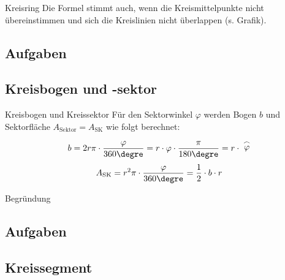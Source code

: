 \begin{bemerkung}{Kreisring}{}
  Die Formel stimmt auch, wenn die Kreismittelpunkte nicht
  übereinstimmen und sich die Kreislinien nicht überlappen (s. Grafik).
  \end{bemerkung}

\subsection*{Aufgaben}


\newpage


\subsection{Kreisbogen und -sektor}
\begin{gesetz}{Kreisbogen und
    Kreissektor}{}
  Für den Sektorwinkel $\varphi$ werden Bogen $b$ und Sektorfläche
  $A_{\text{Sektor}}=A_{\text{SK}}$ wie folgt berechnet:
  
  $$b = 2r\pi \cdot{}\frac{\varphi}{360\degre} = r\cdot{} \varphi
  \cdot{} \frac{\pi}{180\degre}= r\cdot{} \stackrel{\frown}{\varphi}$$
  $$A_{\text{SK}} = r^2\pi\cdot{}\frac{\varphi}{360\degre} = \frac12\cdot{}b\cdot{}r$$
\end{gesetz}


Begründung 

\subsection*{Aufgaben}


\newpage




\subsection{Kreissegment}


